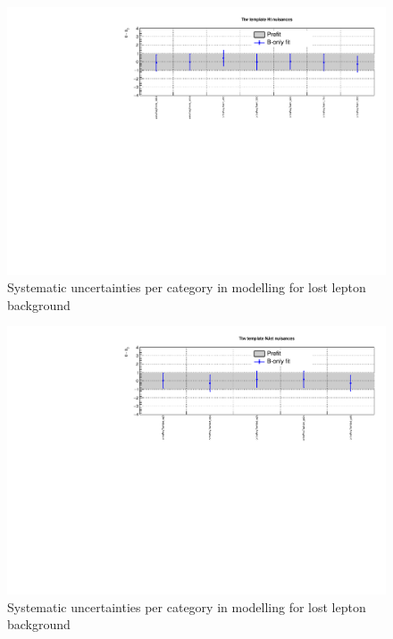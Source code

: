 \clearpage
\begin{figure}[h!]
  \centering
  \caption{Systematic uncertainties per \scalht category in \mht modelling for lost lepton background}
  \includegraphics[width=1.\linewidth]{figures/results/36invfb/postfit/nuis/TemplateTtw_ht_nuisances}
\end{figure}

\begin{figure}[h!]
  \centering
  \caption{Systematic uncertainties per \njet category in \mht modelling for lost lepton background}
  \includegraphics[width=1.\linewidth]{figures/results/36invfb/postfit/nuis/TemplateTtw_njet_nuisances}
\end{figure}

